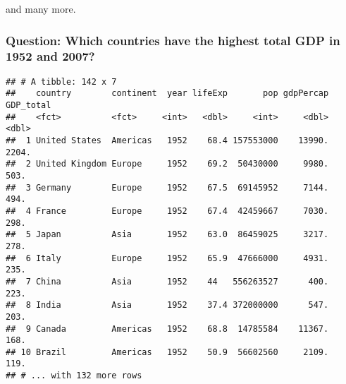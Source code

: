 \documentclass[]{article}
\newenvironment{Shaded}{\begin{snugshade}}{\end{snugshade}}
\newcommand{\KeywordTok}[1]{\textcolor[rgb]{0.13,0.29,0.53}{\textbf{#1}}}
\newcommand{\DecValTok}[1]{\textcolor[rgb]{0.00,0.00,0.81}{#1}}
\newcommand{\StringTok}[1]{\textcolor[rgb]{0.31,0.60,0.02}{#1}}
\newcommand{\OperatorTok}[1]{\textcolor[rgb]{0.81,0.36,0.00}{\textbf{#1}}}
\newcommand{\NormalTok}[1]{#1}
\begin{document}
and many more.

\subsubsection{Question: Which countries have the highest total GDP in
1952 and
2007?}\label{question-which-countries-have-the-highest-total-gdp-in-1952-and-2007}

\begin{Shaded}
\end{Shaded}

\begin{verbatim}
## # A tibble: 142 x 7
##    country        continent  year lifeExp       pop gdpPercap GDP_total
##    <fct>          <fct>     <int>   <dbl>     <int>     <dbl>     <dbl>
##  1 United States  Americas   1952    68.4 157553000    13990.     2204.
##  2 United Kingdom Europe     1952    69.2  50430000     9980.      503.
##  3 Germany        Europe     1952    67.5  69145952     7144.      494.
##  4 France         Europe     1952    67.4  42459667     7030.      298.
##  5 Japan          Asia       1952    63.0  86459025     3217.      278.
##  6 Italy          Europe     1952    65.9  47666000     4931.      235.
##  7 China          Asia       1952    44   556263527      400.      223.
##  8 India          Asia       1952    37.4 372000000      547.      203.
##  9 Canada         Americas   1952    68.8  14785584    11367.      168.
## 10 Brazil         Americas   1952    50.9  56602560     2109.      119.
## # ... with 132 more rows
\end{verbatim}

\begin{Shaded}
\end{Shaded}
\end{document}

